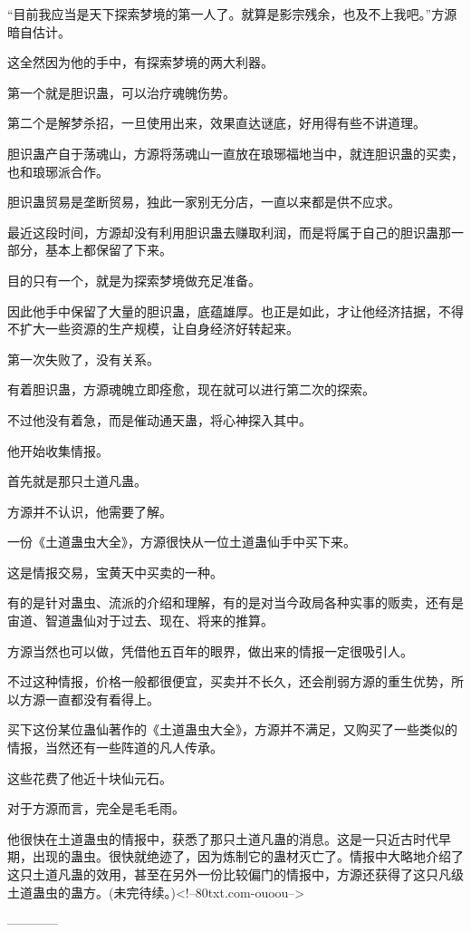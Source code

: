 \begin{this_body}
“目前我应当是天下探索梦境的第一人了。就算是影宗残余，也及不上我吧。”方源暗自估计。

这全然因为他的手中，有探索梦境的两大利器。

第一个就是胆识蛊，可以治疗魂魄伤势。

第二个是解梦杀招，一旦使用出来，效果直达谜底，好用得有些不讲道理。

胆识蛊产自于荡魂山，方源将荡魂山一直放在琅琊福地当中，就连胆识蛊的买卖，也和琅琊派合作。

胆识蛊贸易是垄断贸易，独此一家别无分店，一直以来都是供不应求。

最近这段时间，方源却没有利用胆识蛊去赚取利润，而是将属于自己的胆识蛊那一部分，基本上都保留了下来。

目的只有一个，就是为探索梦境做充足准备。

因此他手中保留了大量的胆识蛊，底蕴雄厚。也正是如此，才让他经济拮据，不得不扩大一些资源的生产规模，让自身经济好转起来。

第一次失败了，没有关系。

有着胆识蛊，方源魂魄立即痊愈，现在就可以进行第二次的探索。

不过他没有着急，而是催动通天蛊，将心神探入其中。

他开始收集情报。

首先就是那只土道凡蛊。

方源并不认识，他需要了解。

一份《土道蛊虫大全》，方源很快从一位土道蛊仙手中买下来。

这是情报交易，宝黄天中买卖的一种。

有的是针对蛊虫、流派的介绍和理解，有的是对当今政局各种实事的贩卖，还有是宙道、智道蛊仙对于过去、现在、将来的推算。

方源当然也可以做，凭借他五百年的眼界，做出来的情报一定很吸引人。

不过这种情报，价格一般都很便宜，买卖并不长久，还会削弱方源的重生优势，所以方源一直都没有看得上。

买下这份某位蛊仙著作的《土道蛊虫大全》，方源并不满足，又购买了一些类似的情报，当然还有一些阵道的凡人传承。

这些花费了他近十块仙元石。

对于方源而言，完全是毛毛雨。

他很快在土道蛊虫的情报中，获悉了那只土道凡蛊的消息。这是一只近古时代早期，出现的蛊虫。很快就绝迹了，因为炼制它的蛊材灭亡了。情报中大略地介绍了这只土道凡蛊的效用，甚至在另外一份比较偏门的情报中，方源还获得了这只凡级土道蛊虫的蛊方。(未完待续。)<!--80txt.com-ouoou-->

------------

\end{this_body}


